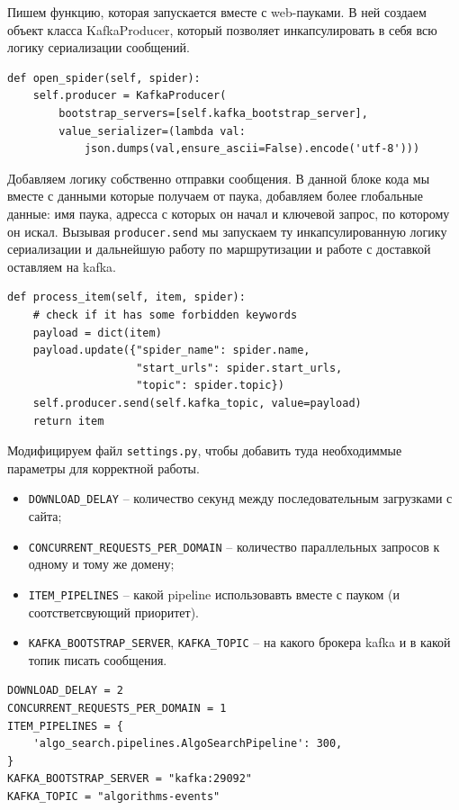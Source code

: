 Пишем функцию, которая запускается вместе с web-пауками. В ней создаем объект
класса KafkaProducer, который позволяет инкапсулировать в себя всю логику
сериализации сообщений.
\begin{verbatim}
def open_spider(self, spider):
    self.producer = KafkaProducer(
        bootstrap_servers=[self.kafka_bootstrap_server],
        value_serializer=(lambda val:
            json.dumps(val,ensure_ascii=False).encode('utf-8')))
\end{verbatim}

Добавляем логику собственно отправки сообщения. В данной блоке кода мы вместе с
данными которые получаем от паука, добавляем более глобальные данные: имя паука,
адресса с которых он начал и ключевой запрос, по которому он искал. Вызывая
\verb|producer.send| мы запускаем ту инкапсулированную логику сериализации и
дальнейшую работу по маршрутизации и работе с доставкой оставляем на kafka.
\begin{verbatim}
def process_item(self, item, spider):
    # check if it has some forbidden keywords
    payload = dict(item)
    payload.update({"spider_name": spider.name,
                    "start_urls": spider.start_urls,
                    "topic": spider.topic})
    self.producer.send(self.kafka_topic, value=payload)
    return item
\end{verbatim}

Модифицируем файл \verb|settings.py|, чтобы добавить туда необходиммые параметры
для корректной работы.
\begin{itemize}
    \item \verb|DOWNLOAD_DELAY| -- количество секунд между последовательным загрузками с сайта;
    \item \verb|CONCURRENT_REQUESTS_PER_DOMAIN| -- количество параллельных
        запросов к одному и тому же домену;
    \item \verb|ITEM_PIPELINES| -- какой pipeline использовавть вместе с пауком
        (и соотстветсвующий приоритет).
    \item \verb|KAFKA_BOOTSTRAP_SERVER|, \verb|KAFKA_TOPIC| -- на какого брокера
        kafka и в какой топик писать сообщения.
\end{itemize}
\begin{verbatim}
DOWNLOAD_DELAY = 2
CONCURRENT_REQUESTS_PER_DOMAIN = 1
ITEM_PIPELINES = {
    'algo_search.pipelines.AlgoSearchPipeline': 300,
}
KAFKA_BOOTSTRAP_SERVER = "kafka:29092"
KAFKA_TOPIC = "algorithms-events"
\end{verbatim}

